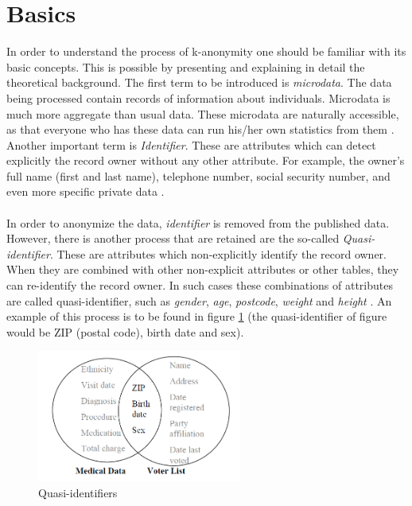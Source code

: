\documentclass{llncs}
\begin{document}
\section{Basics}
In order to understand the process of k-anonymity one should be familiar with its basic concepts. This is possible by presenting and explaining in detail the theoretical background.  The first term to be introduced is \textit{microdata}. The data being processed contain records of information about individuals. Microdata is much more aggregate than usual data. These microdata are naturally accessible, as that everyone who has these data can run his/her own statistics from them  \cite{microdataweb}. 
Another important term is \textit{Identifier}. These are attributes which can detect explicitly the record owner without any other attribute. For example, the owner’s full name (first and last name), telephone number, social security number, and even more specific private data \cite{domingo2008critique}.\\\\
In order to anonymize the data, \textit{identifier} is removed from the published data. However, there is another process that are retained are the so-called \textit{Quasi-identifier}. These are attributes which non-explicitly identify the record owner. When they are combined with other non-explicit attributes or other tables, they can re-identify the record owner. In such cases these combinations of attributes are called quasi-identifier, such as \textit{gender}, \textit{age}, \textit{postcode}, \textit{weight} and \textit{height} \cite{dalenius1986finding}. An example of this process is to be found in figure \ref{quasiidentifier} (the quasi-identifier of figure would be ZIP (postal code), birth date and sex).\\
\begin{figure}[]
	\centering
	\includegraphics[width=0.6\textwidth]{linkingdata.png}
	\caption{Quasi-identifiers}%
	\label{quasiidentifier}
\end{figure}\\
\end{document}
